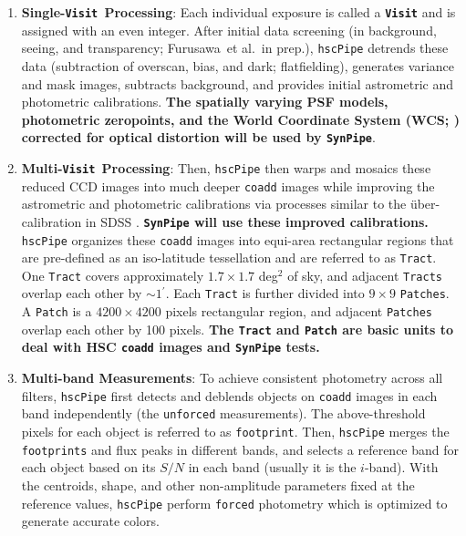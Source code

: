 \documentclass[useamsfonts]{pasj01}
\def\amin{$^\prime$}
\def\etal{{\ et al.~}}
\def\hscpipe{\texttt{hscPipe}}
\def\synpipe{\texttt{SynPipe}}
\def\forced{\texttt{forced}}
\def\unforced{\texttt{unforced}}
\def\tract{\texttt{Tract}}
\def\tracts{\texttt{Tracts}}
\newcommand{\term}[1]{\textbf{\texttt{#1}}}
\begin{document}
    \begin{enumerate}
    
        \item \textbf{Single-\texttt{Visit~}Processing}: 
            Each individual exposure is called a \term{Visit} and is assigned with 
            an even integer. 
            After initial data screening (in background, seeing, and transparency; 
            Furusawa\etal in prep.), \hscpipe{} detrends these data (subtraction 
            of overscan, bias, and dark; flatfielding), generates variance and mask 
            images, subtracts background, and provides initial astrometric and 
            photometric calibrations.  
            \textbf{The spatially varying PSF models, photometric zeropoints, and the 
            World Coordinate System (WCS; \citealt{WCS1, WCS2}) corrected for optical 
            distortion will be used by \synpipe{}}.
            
        \item \textbf{Multi-\texttt{Visit~}Processing}:
            Then, \hscpipe{} then warps and mosaics these reduced CCD images into 
            much deeper \texttt{coadd} images while improving the astrometric and 
            photometric calibrations via processes similar to the \"{u}ber-calibration 
            in SDSS \citep{Padmanabhan2008}. 
            \textbf{\synpipe{} will use these improved calibrations.}
            \hscpipe{} organizes these \texttt{coadd} images into equi-area 
            rectangular regions that are pre-defined as an iso-latitude tessellation 
            and are referred to as \tract{}. 
            One \tract{} covers approximately $1.7\times 1.7$ deg$^2$ of 
            sky, and adjacent \tracts{} overlap each other by ${\sim}1$\amin{}.
            Each \tract{} is further divided into $9\times9$ \texttt{Patches}. 
            A \texttt{Patch} is a $4200\times4200$ pixels rectangular region, and
            adjacent \texttt{Patches} overlap each other by 100 pixels.
            \textbf{The \tract{} and \texttt{Patch} are basic units to deal 
            with HSC \texttt{coadd} images and \synpipe{} tests.}
            
        \item \textbf{Multi-band Measurements}: 
            To achieve consistent photometry across all filters, \hscpipe{} first 
            detects and deblends objects on \texttt{coadd} images in each band 
            independently (the \unforced{} measurements). 
            The above-threshold pixels for each object is referred to as 
            \texttt{footprint}.
            Then, \hscpipe{} merges the \texttt{footprints} and flux peaks in different
            bands, and selects a reference band for each object based on its $S/N$ in 
            each band (usually it is the $i$-band). 
            With the centroids, shape, and other non-amplitude parameters fixed at the
            reference values, \hscpipe{} perform \forced{} photometry which is 
            optimized to generate accurate colors.
            

\end{enumerate}
\end{document}
